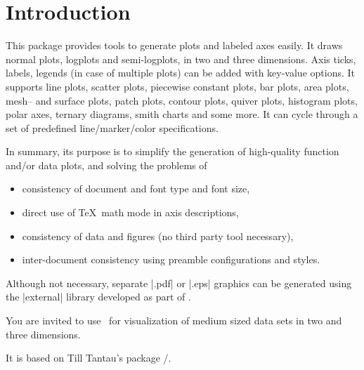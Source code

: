 \tableofcontents
\chapter{Introduction}
This package provides tools to generate plots and labeled axes easily. It draws normal plots, logplots and semi-logplots, in two and three dimensions. Axis ticks, labels, legends (in case of multiple plots) can be added with key-value options. It supports line plots, scatter plots, piecewise constant plots, bar plots, area plots, mesh-- and surface plots, patch plots, contour plots, quiver plots, histogram plots, polar axes, ternary diagrams, smith charts and some more. 
It can cycle through a set of predefined line/marker/color specifications. 

In summary, its purpose is to simplify the generation of high-quality function and/or data plots, and solving the problems of
\begin{itemize}
	\item consistency of document and font type and font size,
	\item direct use of \TeX\ math mode in axis descriptions,
	\item consistency of data and figures (no third party tool necessary),
	\item inter-document consistency using preamble configurations and styles.
\end{itemize}
Although not necessary, separate |.pdf| or |.eps| graphics can be generated using the |external| library developed as part of \Tikz.

You are invited to use \PGFPlots\ for visualization of medium sized data sets in two and three dimensions.

It is based on Till Tantau's package \PGF/\Tikz.
